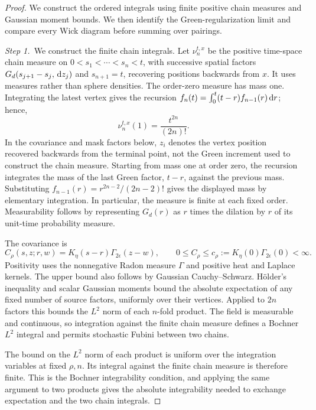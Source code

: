 \begin{proof}
  We construct the ordered integrals using finite positive chain measures and
  Gaussian moment bounds. We then identify the Green-regularization limit and
  compare every Wick diagram before summing over pairings.

  \medskip
  \noindent\textit{Step 1.~}We construct the finite chain integrals.
  Let $\nu_n^{t,x}$ be the positive time-space chain measure on $0 < s_1 <
  \cdots < s_n < t$, with successive spatial factors $G_d(s_{j+1}-s_j,\,\mathrm{d} z_j)$
  and $s_{n+1} = t$, recovering positions backwards from $x$. It uses measures
  rather than sphere densities. The order-zero measure has mass one. Integrating
  the latest vertex gives the recursion $f_n(t) = \int_0^t(t-r)f_{n-1}(r)\,\mathrm{d} r$;
  hence,
  \begin{equation}\label{E:masked-chain-mass}
    \nu_n^{t,x}(1)=\frac{t^{2n}}{(2n)!}.
  \end{equation}
  In the covariance and mask factors below, $z_i$ denotes the vertex position
  recovered backwards from the terminal point, not the Green increment used to
  construct the chain measure.
  Starting from mass one at order zero, the recursion integrates the mass of
  the last Green factor, $t-r$, against the previous mass. Substituting
  $f_{n-1}(r) = r^{2n-2}/(2n-2)!$ gives the displayed mass by elementary
  integration. In particular, the measure is finite at each fixed order.
  Measurability follows by representing $G_d(r)$ as $r$ times the dilation by
  $r$ of its unit-time probability measure.

  The covariance is
  \[
    C_\rho(s,z;r,w)=K_\eta(s-r)\Gamma_{2\epsilon}(z-w),
    \qquad 0\le C_\rho\le c_\rho
    :=K_\eta(0)\Gamma_{2\epsilon}(0)<\infty.
  \]
  Positivity uses the nonnegative Radon measure $\Gamma$ and positive heat and
  Laplace kernels. The upper bound also follows by Gaussian Cauchy--Schwarz.
  H\"older's inequality and scalar Gaussian moments bound the absolute
  expectation of any fixed number of source factors, uniformly over their
  vertices. Applied to $2n$ factors this bounds the $L^2$ norm of each $n$-fold
  product. The field is measurable and continuous, so integration against the
  finite chain measure defines a Bochner $L^2$ integral and permits stochastic
  Fubini between two chains.

  The bound on the $L^2$ norm of each product is uniform over the integration
  variables at fixed $\rho,n$. Its integral against the finite chain measure
  is therefore finite. This is the Bochner integrability condition, and
  applying the same argument to two products gives the absolute integrability
  needed to exchange expectation and the two chain integrals.


\end{proof}
